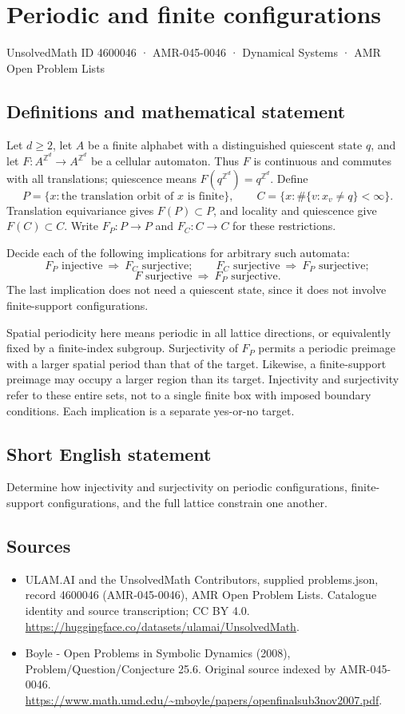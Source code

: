 \documentclass[11pt,a4paper]{article}
\begin{document}
\section*{Periodic and finite configurations}\label{4600046}
{\small UnsolvedMath ID 4600046 · AMR-045-0046 · Dynamical Systems · AMR Open Problem Lists}
\subsection{Definitions and mathematical statement}
Let $d\ge2$, let $A$ be a finite alphabet with a distinguished
quiescent state $q$, and let $F:A^{\mathbb Z^d}\to A^{\mathbb Z^d}$
be a cellular automaton. Thus $F$ is continuous and commutes
with all translations; quiescence means $F(q^{\mathbb Z^d})=
q^{\mathbb Z^d}$. Define
\[
 P=\{x:\text{the translation orbit of }x\text{ is finite}\},
 \qquad C=\{x:\#\{v:x_v\ne q\}<\infty\}.
\]
Translation equivariance gives $F(P)\subset P$, and locality
and quiescence give $F(C)\subset C$. Write $F_P:P\to P$
and $F_C:C\to C$ for these restrictions.

Decide each of the following implications for arbitrary such
automata:
\[
 F_P\text{ injective}\ \Longrightarrow\ F_C\text{ surjective};
 \qquad
 F_C\text{ surjective}\ \Longrightarrow\ F_P\text{ surjective};
\]
\[
 F\text{ surjective}\ \Longrightarrow\ F_P\text{ surjective}.
\]
The last implication does not need a quiescent state, since it
does not involve finite-support configurations.

Spatial periodicity here means periodic in all lattice directions,
or equivalently fixed by a finite-index subgroup. Surjectivity
of $F_P$ permits a periodic preimage with a larger spatial
period than that of the target. Likewise, a finite-support
preimage may occupy a larger region than its target. Injectivity
and surjectivity refer to these entire sets, not to a single
finite box with imposed boundary conditions. Each implication
is a separate yes-or-no target.
\subsection{Short English statement}
Determine how injectivity and surjectivity on periodic configurations, finite-support configurations, and the full lattice constrain one another.
\subsection{Sources}
\begin{itemize}
\item[S1] ULAM.AI and the UnsolvedMath Contributors, supplied problems.json, record 4600046 (AMR-045-0046), AMR Open Problem Lists. Catalogue identity and source transcription; CC BY 4.0.
\url{https://huggingface.co/datasets/ulamai/UnsolvedMath}.
\item[S2] Boyle - Open Problems in Symbolic Dynamics (2008), Problem/Question/Conjecture 25.6. Original source indexed by AMR-045-0046.
\url{https://www.math.umd.edu/~mboyle/papers/openfinalsub3nov2007.pdf}.
\end{itemize}
\end{document}

